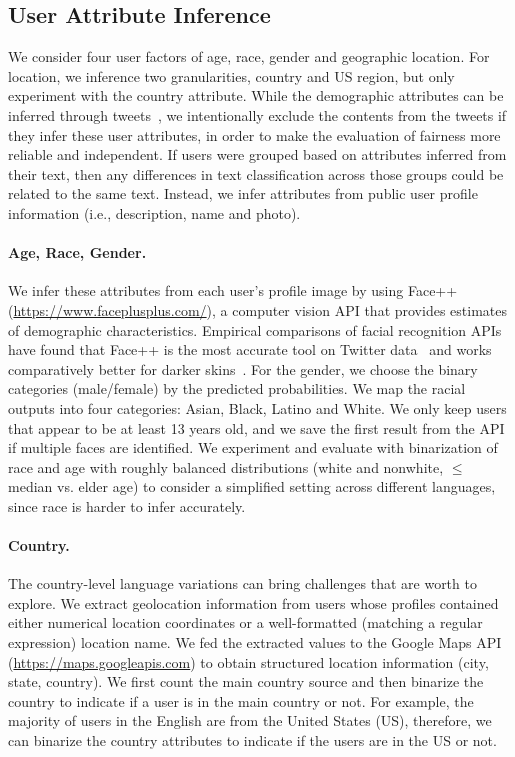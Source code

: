 \subsection{User Attribute Inference}
\label{}
We consider four user factors of age, race, gender and geographic location. For location, we inference two granularities, country and US region, but only experiment with the country attribute.
While the demographic attributes can be inferred through tweets~\cite{volkova2015inferring,davidson2019racial},
we intentionally exclude the contents from the tweets if they infer these user attributes, in order to make the evaluation of fairness more reliable and independent.
If users were grouped based on attributes inferred from their text, then any differences in text classification across those groups could be related to the same text. 
Instead, we infer attributes from public user profile information (i.e., description, name and photo).

\paragraph{Age, Race, Gender.}
We infer these attributes from each user's profile image by using Face++ (\url{https://www.faceplusplus.com/}),
a computer vision API that provides estimates of demographic characteristics.
Empirical comparisons of facial recognition APIs have found that Face++ is the most accurate tool on Twitter data~\cite{jung2018assessing} and works comparatively better for darker skins~\cite{buolamwini2018gender}.
For the gender, we choose the binary categories (male/female) by the predicted probabilities.
We map the racial outputs into four categories: Asian, Black, Latino and White.
We only keep users that appear to be at least 13 years old, and we save the first result from the API if multiple faces are identified.
We experiment and evaluate with binarization of race and age with roughly balanced distributions (white and nonwhite, $\leq$ median vs. elder age) to consider a simplified setting across different languages, since race is harder to infer accurately.

\paragraph{Country.}
The country-level language variations can bring challenges that are worth to explore.
We extract geolocation information from users whose profiles contained either numerical location coordinates or a well-formatted (matching a regular expression) location name. 
We fed the extracted values to the Google Maps API (\url{https://maps.googleapis.com}) to obtain structured location information (city, state, country).
We first count the main country source and then binarize the country to indicate if a user is in the main country or not. 
For example, the majority of users in the English are from the United States (US), therefore, we can binarize the country attributes to indicate if the users are in the US or not.

